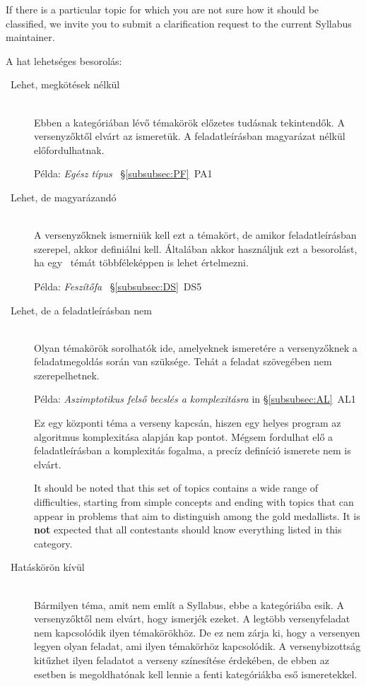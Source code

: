 \documentclass[a4paper,11pt,oneside]{article}
\newcommand{\cmark}{\ding{51}}%
\newcommand{\cincl}{{\small\cmark}}
\newcommand{\cdefi}{{\small\cmark\faFileTextO}}
\newcommand{\ccode}{{\small\cmark\faFileText}}
\newcommand{\cnfoc}{{\small\faQuestion}}
\begin{document}
If there is a particular topic for which you are not sure how it should
be classified, we invite you to submit a clarification request to the 
current Syllabus maintainer.

\bigskip

\noindent
A hat lehetséges besorolás:

\begin{description}
\item[\cincl\ Lehet, megkötések nélkül]~\\
    Ebben a kategóriában lévő témakörök előzetes tudásnak tekintendők. A versenyzőktől elvárt az ismeretük.
    A feladatleírásban magyarázat nélkül előfordulhatnak.

    Példa: \emph{Egész típus} ~\S\ref{subsubsec:PF}~PA1

\item[\cdefi\ Lehet, de magyarázandó]~\\
    A versenyzőknek ismerniük kell ezt a témakört, de amikor feladatleírásban szerepel, akkor definiálni kell.
    Általában akkor használjuk ezt a besorolást, ha egy \cincl\  témát többféleképpen is lehet értelmezni.

    Példa: \emph{Feszítőfa} ~\S\ref{subsubsec:DS}~DS5

\item[\ccode\ Lehet, de a feladatleírásban nem]~\\
    Olyan témakörök sorolhatók ide, amelyeknek ismeretére a versenyzőknek a feladatmegoldás során van szüksége.
    Tehát a feladat szövegében nem szerepelhetnek.
    
    Példa: \emph{Aszimptotikus felső becslés a komplexitásra}
    in \S\ref{subsubsec:AL}~AL1

    Ez egy központi téma a verseny kapcsán, hiszen egy helyes program az algoritmus komplexitása alapján kap pontot.
    Mégsem fordulhat elő a feladatleírásban a komplexitás fogalma, a precíz definíció ismerete nem is elvárt.

    It should be noted that this set of topics
    contains a wide range of difficulties, starting from simple concepts and ending 
    with topics that can appear in problems that aim to distinguish among 
    the gold medallists. It is \textbf{not} expected that all contestants
    should know everything listed in this category.

\item[\cnfoc\ Hatáskörön kívül]~\\
    Bármilyen téma, amit nem említ a Syllabus, ebbe a kategóriába esik.
    A versenyzőktől nem elvárt, hogy ismerjék ezeket. A legtöbb versenyfeladat
    nem kapcsolódik ilyen témakörökhöz. De ez nem zárja ki, hogy a versenyen
    legyen olyan feladat, ami ilyen témakörhöz kapcsolódik. A versenybizottság
    kitűzhet ilyen feladatot a verseny színesítése érdekében, de ebben az esetben
    is megoldhatónak kell lennie a fenti kategóriákba eső ismeretekkel.   



\end{description}
\end{document}
